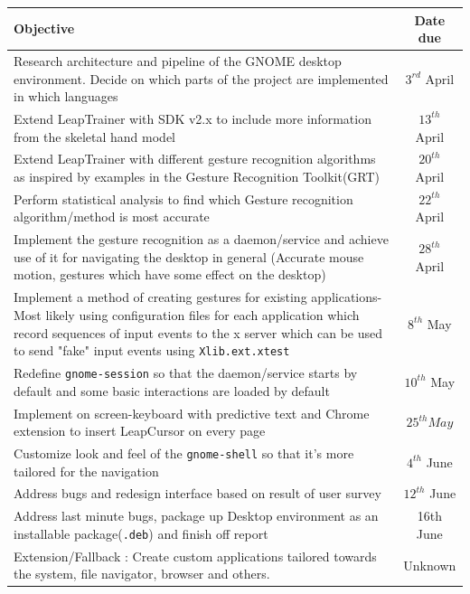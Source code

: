 \documentclass[a4paper]{article}
\begin{document}
\begin{center}
\begin{tabular}{| p{12cm} |c|}
\hline
Objective & Date due \\
\hline Research architecture and pipeline of the GNOME desktop environment. Decide on which parts of the project are implemented in which languages & $3^{rd}$ April\\
\hline Extend LeapTrainer\cite{LeapTrainer} with SDK v2.x to include more information from the skeletal hand model &$13^{th}$ April \\
\hline Extend LeapTrainer with different gesture recognition algorithms as inspired by examples in the Gesture Recognition Toolkit(GRT) & $20^{th}$ April\\
\hline Perform statistical analysis to find which Gesture recognition algorithm/method is most accurate & $22^{th}$ April \\
\hline
Implement the gesture recognition as a daemon/service and achieve use of it for navigating the desktop in general (Accurate mouse motion, gestures which have some effect on the desktop) & $28^{th}$ April \\
\hline
Implement a method of creating gestures for existing applications- Most likely using configuration files for each application which record sequences of input events to the x server which can be used to send "fake" input events using \texttt{Xlib.ext.xtest} & $8^{th}$ May \\
\hline 
Redefine \texttt{gnome-session} so that the daemon/service starts by default and some basic interactions are loaded by default & $10^{th}$ May \\
\hline
Implement on screen-keyboard with predictive text and Chrome extension to insert LeapCursor\cite{LeapCursor} on every page& $25^{th} May$\\
\hline
Customize look and feel of the \texttt{gnome-shell} so that it's more tailored for the navigation & $4^{th}$ June \\
\hline
Address bugs and redesign interface based on result of user survey & $12^{th}$ June \\
\hline
Address last minute bugs, package up Desktop environment as an installable package(\texttt{.deb}) and finish off report & 16th June \\
\hline
Extension/Fallback : Create custom applications tailored towards the system, file navigator, browser and others. & Unknown \\
\hline
\end{tabular}
\end{center}
\end{document}
